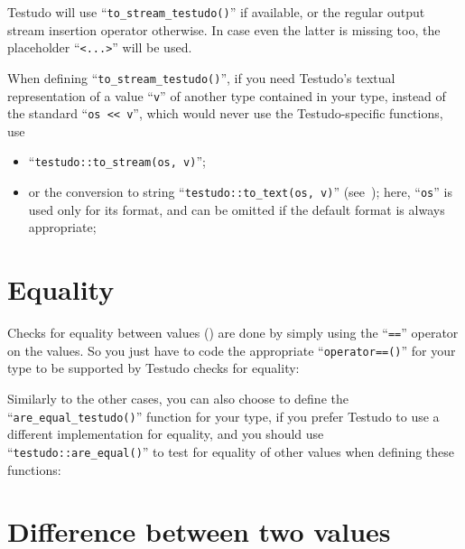 \documentclass[twoside, a4paper, article]{memoir}
\providecommand\typesetexample[1]{%
}
\begin{document}
Testudo will use ``\texttt{to\_stream\_testudo()}'' if available, or the
regular output stream insertion operator otherwise.  In case even the latter is
missing too, the placeholder ``\texttt{<...>}'' will be used.

When defining ``\texttt{to\_stream\_testudo()}'', if you need Testudo's textual
representation of a value ``\texttt{v}'' of another type contained in your
type, instead of the standard ``\texttt{os <{}< v}'', which would never use the
Testudo-specific functions, use
\begin{itemize}
\item ``\texttt{testudo::to\_stream(os, v)}'';

  \typesetexample{testudo-support-my-vector-to-stream-testudo-to-stream}

\item or the conversion to string ``\texttt{testudo::to\_text(os, v)}''
  (see~); here, ``\texttt{os}''
  is used only for its format, and can be omitted if the default format is
  always appropriate;

  \typesetexample{testudo-support-my-vector-to-stream-testudo-to-text}

\end{itemize}


\section{Equality}
\label{sec:equality}

Checks for equality between values
() are done by simply using the
``\texttt{==}'' operator on the values.  So you just have to code the
appropriate ``\texttt{operator==()}'' for your type to be supported by Testudo
checks for equality:

\typesetexample{testudo-support-my-pair-equality}

Similarly to the other cases, you can also choose to define the
``\texttt{are\_equal\_testudo()}'' function for your type, if you prefer
Testudo to use a different implementation for equality, and you should use
``\texttt{testudo::are\_equal()}'' to test for equality of other values when
defining these functions:

\typesetexample{testudo-support-my-pair-are-equal-testudo}

\section{Difference between two values}
\label{sec:difference-between-two-values}
\end{document}
